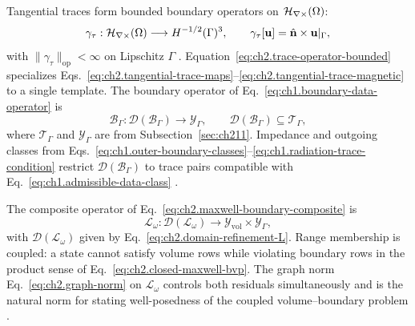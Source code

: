 Tangential traces form bounded boundary operators on \(\mathcal{H}_{\nabla\times}(\Omega)\):
\begin{equation}
\label{eq:ch2.trace-operator-bounded}
\gamma_\tau:\mathcal{H}_{\nabla\times}(\Omega)\longrightarrow H^{-1/2}(\Gamma)^{3},
\qquad
\gamma_\tau[\mathbf{u}]=\hat{\mathbf{n}}\times\mathbf{u}|_{\Gamma},
\end{equation}
with \(\|\gamma_\tau\|_{\mathrm{op}}<\infty\) on Lipschitz \(\Gamma\) \cite{stratton1941}. Equation~\eqref{eq:ch2.trace-operator-bounded} specializes Eqs.~\eqref{eq:ch2.tangential-trace-maps}--\eqref{eq:ch2.tangential-trace-magnetic} to a single template. The boundary operator of Eq.~\eqref{eq:ch1.boundary-data-operator} is
\begin{equation}
\label{eq:ch2.boundary-operator-domain-range}
\mathcal{B}_\Gamma:\mathcal{D}(\mathcal{B}_\Gamma)\longrightarrow\mathcal{Y}_\Gamma,
\qquad
\mathcal{D}(\mathcal{B}_\Gamma)\subseteq\mathcal{T}_\Gamma,
\end{equation}
where \(\mathcal{T}_\Gamma\) and \(\mathcal{Y}_\Gamma\) are from Subsection~\ref{sec:ch211}. Impedance and outgoing classes from Eqs.~\eqref{eq:ch1.outer-boundary-classes}--\eqref{eq:ch1.radiation-trace-condition} restrict \(\mathcal{D}(\mathcal{B}_\Gamma)\) to trace pairs compatible with Eq.~\eqref{eq:ch1.admissible-data-class} \cite{stratton1941}.

The composite operator of Eq.~\eqref{eq:ch2.maxwell-boundary-composite} is
\begin{equation}
\label{eq:ch2.composite-operator-domain}
\mathcal{L}_\omega:\mathcal{D}(\mathcal{L}_\omega)\longrightarrow
\mathcal{Y}_{\mathrm{vol}}\times\mathcal{Y}_\Gamma,
\end{equation}
with \(\mathcal{D}(\mathcal{L}_\omega)\) given by Eq.~\eqref{eq:ch2.domain-refinement-L}. Range membership is coupled: a state cannot satisfy volume rows while violating boundary rows in the product sense of Eq.~\eqref{eq:ch2.closed-maxwell-bvp}. The graph norm Eq.~\eqref{eq:ch2.graph-norm} on \(\mathcal{L}_\omega\) controls both residuals simultaneously and is the natural norm for stating well-posedness of the coupled volume--boundary problem \cite{harrington2001}.

